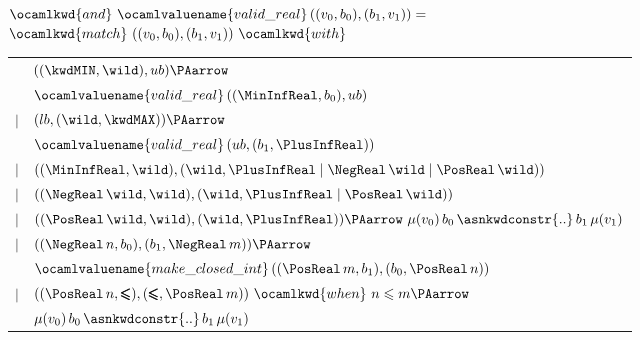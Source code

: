 

        $\ocamlkwd{and} \,\, \ocamlvaluename{valid\_real} \, ((v_0,
        b_0), (b_1, v_1)) =$\\
        \hspace*{3mm}
        $\ocamlkwd{match} \,\, ((v_0, b_0), (b_1, v_1)) \,\, \ocamlkwd{with}$ \\ 
        \hspace*{6mm}
        \begin{tabular}{rl}
             & $((\kwdMIN, \wild), ub) \PAarrow$\\
             & \hspace*{3mm}
               $\ocamlvaluename{valid\_real} \, ((\MinInfReal, b_0), ub)$\\
           $\mid$
             & $(lb, (\wild, \kwdMAX)) \PAarrow$\\
             & \hspace*{3mm}
               $\ocamlvaluename{valid\_real} \, (ub, (b_1, \PlusInfReal))$\\
           $\mid$
             & $((\MinInfReal, \wild), (\wild, \PlusInfReal \mid \NegReal \, \wild \mid
                \PosReal \, \wild))$\\
           $\mid$ 
             & $((\NegReal \, \wild, \wild), (\wild, \PlusInfReal \mid
                \PosReal \, \wild))$\\
           $\mid$
             & $((\PosReal \, \wild, \wild), (\wild, \PlusInfReal)) \PAarrow
                \,\, \mu(v_0) \, b_0 \,
                \asnkwdconstr{..} \, b_1 \, \mu(v_1)$\\ 
           $\mid$
             & $((\NegReal \, n, b_0), (b_1, \NegReal \, m)) \PAarrow$\\
             & \hspace*{3mm}
               $\ocamlvaluename{make\_closed\_int} \, ((\PosReal \, m,
                b_1),(b_0, \PosReal \, n))$\\
           $\mid$ 
             & $((\PosReal \, n, \pmb{\leqslant}), (\pmb{\leqslant},
                \PosReal \, m)) \,\, \ocamlkwd{when} \,\, n \leqslant
                m \PAarrow$\\
             & \hspace*{3mm}
               $\mu(v_0) \, b_0 \, \asnkwdconstr{..} \, b_1 \,
                \mu(v_1)$\\ 

\end{tabular}
